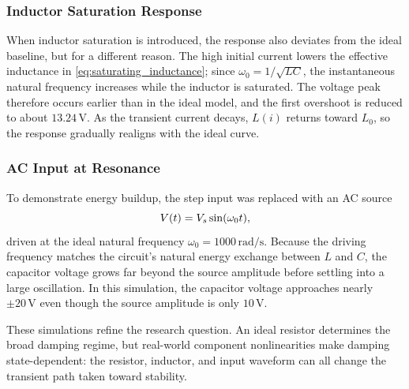 \subsubsection{Inductor Saturation Response}

When inductor saturation is introduced, the response also deviates from the
ideal baseline, but for a different reason.
The high initial current lowers the effective inductance in
\eqref{eq:saturating_inductance}; since
$\omega_0=1/\sqrt{LC}$, the instantaneous natural frequency increases while
the inductor is saturated.
The voltage peak therefore occurs earlier than in the ideal model, and the
first overshoot is reduced to about $13.24\,\mathrm{V}$.
As the transient current decays, $L(i)$ returns toward $L_0$, so the response
gradually realigns with the ideal curve.

\subsubsection{AC Input at Resonance}

To demonstrate energy buildup, the step input was replaced with an AC source
\begin{equation}
  V(t) = V_s \sin(\omega_0 t),
  \label{eq:resonant_ac_input}
\end{equation}
driven at the ideal natural frequency $\omega_0=1000\,\mathrm{rad/s}$.
Because the driving frequency matches the circuit's natural energy exchange
between $L$ and $C$, the capacitor voltage grows far beyond the source
amplitude before settling into a large oscillation.
In this simulation, the capacitor voltage approaches nearly
$\pm20\,\mathrm{V}$ even though the source amplitude is only $10\,\mathrm{V}$.

These simulations refine the research question.
An ideal resistor determines the broad damping regime, but real-world
component nonlinearities make damping state-dependent: the resistor, inductor,
and input waveform can all change the transient path taken toward stability.
